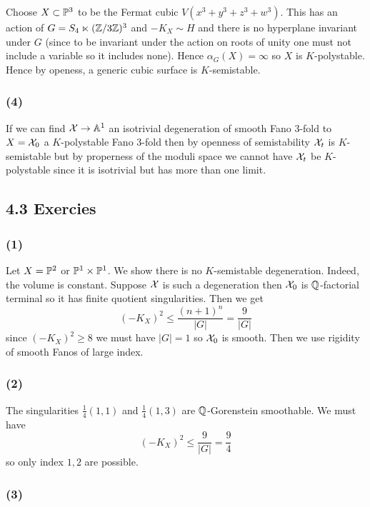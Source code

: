 \documentclass[12pt]{article}
\begin{document}
Choose $X \subset \P^3$ to be the Fermat cubic $V(x^3 + y^3 + z^3 + w^3)$. This has an action of $G = S_4 \ltimes (\Z / 3 \Z)^3$ and $-K_X \sim H$ and there is no hyperplane invariant under $G$ (since to be invariant under the action on roots of unity one must not include a variable so it includes none). Hence $\alpha_G(X) = \infty$ so $X$ is $K$-polystable. Hence by openess, a generic cubic surface is $K$-semistable. 

\subsubsection{(4)}

If we can find $\X \to \A^1$ an isotrivial degeneration of smooth Fano 3-fold to $X = \X_0$ a $K$-polystable Fano $3$-fold then by openness of semistability $\X_t$ is $K$-semistable but by properness of the moduli space we cannot have $\X_t$ be $K$-polystable since it is isotrivial but has more than one limit. 
\bigskip\\

\subsection{4.3 Exercies}

\subsubsection{(1)}

Let $X = \P^2$ or $\P^1 \times \P^1$. We show there is no $K$-semistable degeneration. Indeed, the volume is constant. Suppose $\X$ is such a degeneration then $\X_0$ is $\Q$-factorial terminal so it has finite quotient singularities. Then we get
\[ (-K_X)^2 \le \frac{(n+1)^n}{|G|} = \frac{9}{|G|} \]
since $(-K_X)^2 \ge 8$ we must have $|G| = 1$ so $\X_0$ is smooth. Then we use rigidity of smooth Fanos of large index.


\subsubsection{(2)}

The singularities $\frac{1}{4}(1,1)$ and $\frac{1}{4}(1,3)$ are $\Q$-Gorenstein smoothable. We must have
\[ (-K_X)^2 \le \frac{9}{|G|} = \frac{9}{4} \]
so only index $1,2$ are possible.


\subsubsection{(3)}
\end{document}
